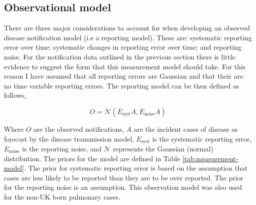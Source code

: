\documentclass[11pt,twoside]{bristolthesis}
\begin{document}
  \hypertarget{observational-model}{%
  \subsection{Observational model}\label{observational-model}}
  
  There are three major considerations to account for when developing an observed disease notification model (i.e a reporting model). These are: systematic reporting error over time; systematic changes in reporting error over time; and reporting noise. For the notification data outlined in the previous section there is little evidence to suggest the form that this measurement model should take. For this reason I have assumed that all reporting errors are Gaussian and that their are no time variable reporting errors. The reporting model can be then defined as follows,
  
  \[O = \mathcal{N}\left(E_{\text{syst}}A, E_{\text{noise}}A\right)\]
  
  Where \(O\) are the observed notifications, \(A\) are the incident cases of disease as forecast by the disease transmission model, \(E_{\text{syst}}\) is the systematic reporting error, \(E_{\text{noise}}\) is the reporting noise, and \(\mathcal{N}\) represents the Gaussian (normal) distribution. The priors for the model are defined in Table \ref{tab:measurement-model}. The prior for systematic reporting error is based on the assumption that cases are less likely to be reported than they are to be over reported. The prior for the reporting noise is an assumption. This observation model was also used for the non-UK born pulmonary cases.
  
\end{document}
